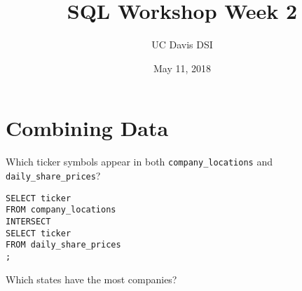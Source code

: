 \documentclass[10pt]{exam}
\begin{document}
 
\title{SQL Workshop Week 2}
\author{UC Davis DSI}
\date{May 11, 2018}

\maketitle

\section{Combining Data}

\begin{questions}

    \question Which ticker symbols appear in both
    \texttt{company\_locations} and \texttt{daily\_share\_prices}?

\begin{solution}
\begin{lstlisting}
SELECT ticker
FROM company_locations
INTERSECT
SELECT ticker
FROM daily_share_prices
;
\end{lstlisting}
\end{solution}


\question Which states have the most companies?

\begin{solution}
\begin{lstlisting}
\end{lstlisting}
\end{solution}



\end{questions}
\end{document}
